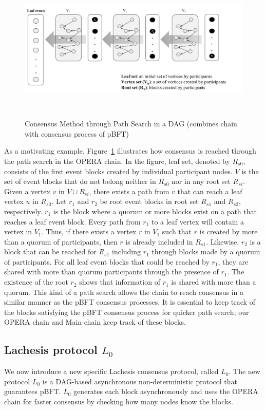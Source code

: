 \documentclass[preprint,12pt]{elsarticle}
\begin{document}
\begin{figure}[h] \centering
	\includegraphics[height=7cm, width=1.0\columnwidth]{pBFTtoPath}
	\caption{Consensus Method through Path Search in a DAG (combines chain with consensus process of pBFT)}
	\label{fig:pBFTtoPath}
\end{figure}
As a motivating example, Figure~\ref{fig:pBFTtoPath} illustrates how consensus is reached through the path search in the OPERA chain. In the figure, leaf set, denoted by $R_{s0}$, consists of the first event blocks created by individual participant nodes. $V$ is the set of event blocks that do not belong neither in $R_{s0}$ nor in any root set $R_{si}$.
Given a vertex $v$ in $V \cup R_{si}$, there exists a path from $v$ that can reach a leaf vertex $u$ in $R_{s0}$. 
Let $r_1$ and $r_2$ be root event blocks in root set $R_{s1}$ and $R_{s2}$, respectively.
$r_1$ is the block where a quorum or more blocks exist on a path that reaches a leaf event block. 
Every path from $r_1$ to a leaf vertex will contain a vertex in $V_1$. Thus, if there exists a vertex $r$ in $V_1$ such that $r$ is created by more than a quorum of participants, then $r$ is already included in $R_{s1}$. Likewise, $r_2$ is a block that can be reached for $R_{s1}$ including $r_1$ through blocks made by a quorum of participants.
For all leaf event blocks that could be reached by $r_1$, they are shared with more than quorum participants through the presence of $r_1$. The existence of the root $r_2$ shows that information of $r_1$ is shared with more than a quorum. 
This kind of a path search allows the chain to reach consensus in a similar manner as the pBFT consensus processes. It is essential to keep track of the blocks satisfying the pBFT consensus process for quicker path search; our OPERA chain and Main-chain keep track of these blocks.


\subsection{Lachesis protocol $L_0$}
We now introduce a new specific Lachesis consensus protocol, called $L_0$. The new protocol $L_0$ is a DAG-based asynchronous non-deterministic protocol that guarantees pBFT.
$L_0$ generates each block asynchronously and uses the OPERA chain for faster consensus by checking how many nodes know the blocks.
\end{document}

